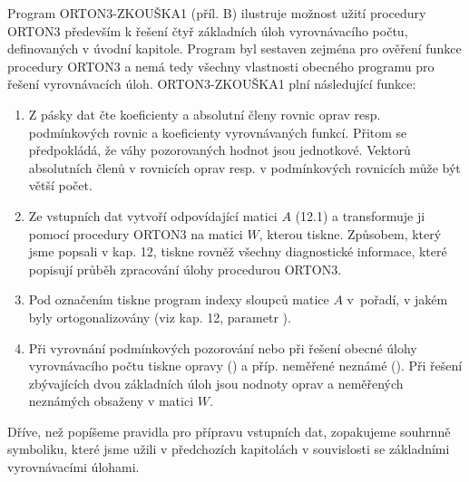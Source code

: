 Program  ORTON3-ZKOUŠKA1 (příl. B) ilustruje možnost užití
procedury ORTON3 především k řešení čtyř základních úloh
vyrovnávacího počtu, definovaných v úvodní kapitole. Program byl
sestaven zejména pro ověření funkce procedury ORTON3 a nemá
tedy všechny vlastnosti obecného programu pro řešení
vyrovnávacích úloh. ORTON3-ZKOUŠKA1 plní následující funkce:

\begin{enumerate}
\item
Z pásky dat čte koeficienty a absolutní členy rovnic oprav
resp. podmínkových rovnic a koeficienty vyrovnávaných funkcí.  Přitom
se předpokládá, že váhy pozorovaných hodnot jsou jednotkové. Vektorů
absolutních členů v rovnicích oprav resp. v podmínkových rovnicích
může být větší počet.

\item
Ze vstupních dat vytvoří odpovídající matici $A$ (12.1) a transformuje
ji pomocí procedury ORTON3 na matici $W$, kterou tiskne. Způsobem,
který jsme popsali v kap. 12, tiskne rovněž všechny diagnostické
informace, které popisují průběh zpracování úlohy procedurou ORTON3.

\item
Pod označením  tiskne program indexy
sloupců matice $A$ v~pořadí, v jakém byly ortogonalizovány (viz kap.
12, parametr ).

\item
Při  vyrovnání podmínkových pozorování nebo při řešení obecné úlohy
vyrovnávacího počtu tiskne opravy () a
příp. neměřené neznámé (). Při řešení zbývajících
dvou základních úloh jsou nodnoty oprav a neměřených neznámých
obsaženy v matici $W$.
\end{enumerate}

Dříve, než popíšeme pravidla pro přípravu vstupních dat,
zopakujeme souhrnně symboliku, které jsme užili v předchozích
kapitolách v souvislosti se základními vyrovnávacími úlohami.

